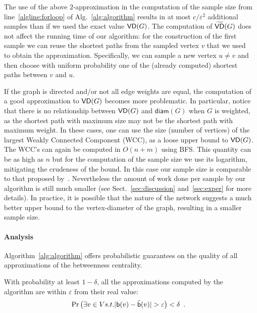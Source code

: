 The use of the above $2$-approximation in the computation of the
sample size from line~\ref{algline:forloop} of Alg.~\ref{alg:algorithm} results
in at most $c/\varepsilon^2$ additional samples than if we
used the exact value $\mathsf{VD}(G)$. The computation of $\widetilde{\mathsf{VD}}(G)$
does not affect the running time of our algorithm: for the construction of
the first sample we can reuse the shortest paths from the sampled
vertex $v$ that we used to obtain the approximation. Specifically, we can sample
a new vertex $u\neq v$ and then choose with uniform probability one of the
(already computed) shortest paths between $v$ and $u$.

If the graph is directed and/or not all edge weights are equal, the computation
of a good approximation to $\mathsf{VD}(G)$ becomes more problematic. In particular,
notice that there is no relationship between $\mathsf{VD}(G)$ and $\mathsf{diam}(G)$
when $G$ is weighted, as the shortest path with maximum size may not be the
shortest path with maximum weight. In these cases, one can use the size (number
of vertices) of the largest Weakly Connected Component (WCC), as a loose upper
bound to $\mathsf{VD}(G)$. The WCC's can again be computed in $O(n+m)$ using BFS.
This quantity can be as high as $n$ but for the computation of the sample
size we use its logarithm, mitigating the crudeness of the bound. In this case
our sample size is comparable to that proposed
by~\citet{BrandesP07}. 
Nevertheless the amount of work done per sample by our algorithm is still much
smaller (see Sect.~\ref{sec:discussion} and~\ref{sec:exper} for more
details). In practice, it is possible that the nature of the network suggests a
much better upper bound to the vertex-diameter of the graph, resulting in a
smaller sample size. %

\paragraph{Analysis}\label{sec:analysis}
Algorithm~\ref{alg:algorithm} offers
probabilistic guarantees on the quality of all approximations of the betweenness
centrality.
\begin{lemma}\label{lem:correctness}
  With probability at least $1-\delta$, all the approximations computed by the
  algorithm are within $\varepsilon$ from their real value:
  \[
  \Pr\left(\exists v\in V \mbox{ s.t. }
  |\betw(v)-\tilde\betw(v)|>\varepsilon\right)<\delta\enspace .
  \]
\end{lemma}

